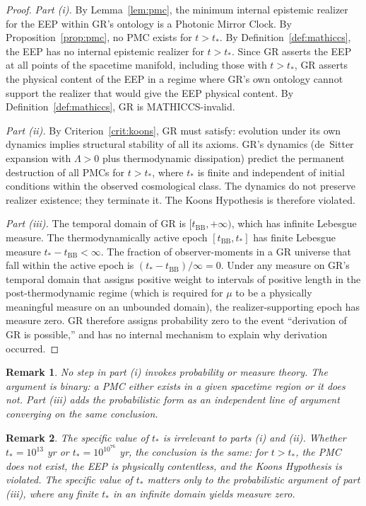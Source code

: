 \documentclass[11pt,a4paper]{article}
\newtheorem{remark}{Remark}
\begin{document}
\begin{proof}
\textit{Part (i).} By Lemma~\ref{lem:pmc}, the minimum internal epistemic realizer for the EEP within
GR's ontology is a Photonic Mirror Clock. By Proposition~\ref{prop:pmc}, no PMC exists for $t > t_*$.
By Definition~\ref{def:mathiccs}, the EEP has no internal epistemic realizer for $t > t_*$.
Since GR asserts the EEP at all points of the spacetime manifold, including those with
$t > t_*$, GR asserts the physical content of the EEP in a regime where GR's own
ontology cannot support the realizer that would give the EEP physical content.
By Definition~\ref{def:mathiccs}, GR is MATHICCS-invalid.

\textit{Part (ii).} By Criterion~\ref{crit:koons}, GR must satisfy: evolution under
its own dynamics implies structural stability of all its axioms. GR's dynamics
(de~Sitter expansion with $\Lambda > 0$ plus thermodynamic dissipation) predict the
permanent destruction of all PMCs for $t > t_*$, where $t_*$ is finite and
independent of initial conditions within the observed cosmological class. The dynamics
do not preserve realizer existence; they terminate it. The Koons Hypothesis is
therefore violated.

\textit{Part (iii).} The temporal domain of GR is $[t_{\mathrm{BB}}, +\infty)$, which
has infinite Lebesgue measure. The thermodynamically active epoch
$[t_{\mathrm{BB}}, t_*]$ has finite Lebesgue measure $t_* - t_{\mathrm{BB}} < \infty$.
The fraction of observer-moments in a GR universe that fall within the active epoch is
$(t_* - t_{\mathrm{BB}}) / \infty = 0$. Under any measure on GR's temporal domain that
assigns positive weight to intervals of positive length in the post-thermodynamic
regime (which is required for $\mu$ to be a physically meaningful measure on an
unbounded domain), the realizer-supporting epoch has measure zero. GR therefore
assigns probability zero to the event ``derivation of GR is possible,'' and has no
internal mechanism to explain why derivation occurred.
\end{proof}

\begin{remark}
No step in part (i) invokes probability or measure theory. The argument is binary:
a PMC either exists in a given spacetime region or it does not. Part (iii) adds the
probabilistic form as an independent line of argument converging on the same
conclusion.
\end{remark}

\begin{remark}
The specific value of $t_*$ is irrelevant to parts (i) and (ii). Whether
$t_* = 10^{13}$ yr or $t_* = 10^{10^{76}}$ yr, the conclusion is the same: for
$t > t_*$, the PMC does not exist, the EEP is physically contentless, and the Koons
Hypothesis is violated. The specific value of $t_*$ matters only to the probabilistic
argument of part (iii), where any finite $t_*$ in an infinite domain yields measure
zero.
\end{remark}
\end{document}
